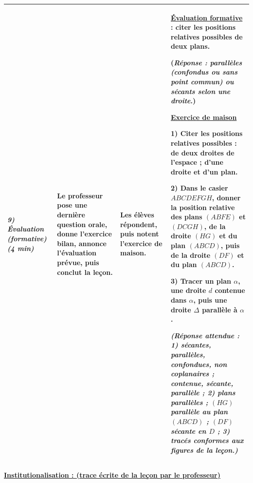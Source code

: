 \documentclass[10pt]{article}
\newcommand{\titreR}[1]{\underline{\textcolor{rougetitre}{\bfseries #1}}}
\newcommand{\maison}{\underline{\textcolor{rougemaison}{\bfseries Exercice de maison}}}
\newcommand{\moment}[1]{\textbf{\itshape #1}}
\begin{document}
\begin{longtable}{|p{2.35cm}|p{5.35cm}|p{4.55cm}|p{13.85cm}|}
\moment{9) Évaluation (formative) (4 min)} &
Le professeur pose une dernière question orale, donne l'exercice bilan, annonce l'évaluation
prévue, puis conclut la leçon. &
Les élèves répondent, puis notent l'exercice de maison. &
\titreR{Évaluation formative} : citer les positions relatives possibles de deux plans. \par
(\textit{Réponse : parallèles (confondus ou sans point commun) ou sécants selon une droite}.) \par
\maison \par
\textbf{1)} Citer les positions relatives possibles : de deux droites de l'espace ; d'une droite
et d'un plan. \par
\textbf{2)} Dans le casier $ABCDEFGH$, donner la position relative des plans $(ABFE)$ et
$(DCGH)$, de la droite $(HG)$ et du plan $(ABCD)$, puis de la droite $(DF)$ et du plan $(ABCD)$. \par
\textbf{3)} Tracer un plan $\alpha$, une droite $d$ contenue dans $\alpha$, puis une droite
$\Delta$ parallèle à $\alpha$. \par
\textit{(Réponse attendue : 1) sécantes, parallèles, confondues, non coplanaires ; contenue,
sécante, parallèle ; 2) plans parallèles ; $(HG)$ parallèle au plan $(ABCD)$ ; $(DF)$ sécante en
$D$ ; 3) tracés conformes aux figures de la leçon.)} \\ \hline
\end{longtable}

\begin{center}
\underline{\textcolor{rougetitre}{\large\bfseries Institutionalisation \; : \; (trace écrite de la leçon par le professeur)}}
\end{center}
\end{document}
